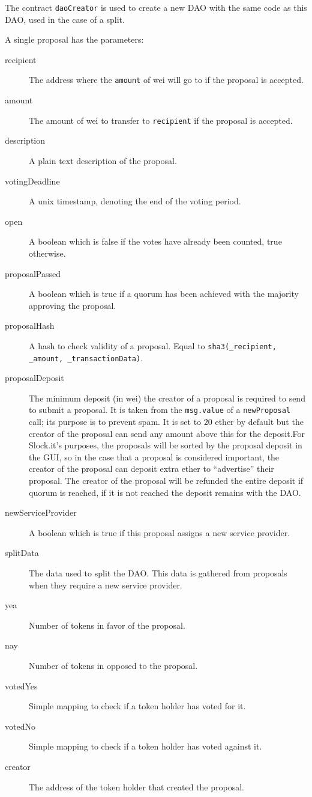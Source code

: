 \documentclass[9pt,oneside]{amsart}
\begin{document}
\begin{multicols}{2}
The contract \verb|daoCreator| is used to create a new DAO with the same code as this DAO, used in the case of a split.

A single proposal has the parameters:
\begin{description}
 \item[recipient] The address where the \verb|amount| of wei will go to if the proposal is accepted.
 \item[amount] The amount of wei to transfer to \verb|recipient| if the proposal is accepted.
 \item[description] A plain text description of the proposal.
 \item[votingDeadline] A unix timestamp, denoting the end of the voting period.
 \item[open] A boolean which is false if the votes have already been counted, true otherwise.
 \item[proposalPassed] A boolean which is true if a quorum has been achieved with the majority approving the proposal.
 \item[proposalHash] A hash to check validity of a proposal. Equal to \verb|sha3(_recipient, _amount, _transactionData)|.
 \item[proposalDeposit] The minimum deposit (in wei) the creator of a proposal is required to send to submit a proposal. It is taken from the \verb|msg.value| of a \verb|newProposal| call; its purpose is to prevent spam. It is set to $20$ ether by default but the creator of the proposal can send any amount above this for the deposit.For Slock.it’s purposes, the proposals will be sorted by the proposal deposit in the GUI, so in the case that a proposal is considered important, the creator of the proposal can deposit extra ether to “advertise” their proposal. The creator of the proposal will be refunded the entire deposit if quorum is reached, if it is not reached the deposit remains with the DAO. 
 \item[newServiceProvider] A boolean which is true if this proposal assigns a new service provider.
 \item[splitData] The data used to split the DAO. This data is gathered from proposals when they require a new service provider.
 \item[yea] Number of tokens in favor of the proposal.
 \item[nay] Number of tokens in opposed to the proposal.
 \item[votedYes] Simple mapping to check if a token holder has voted for it.
 \item[votedNo] Simple mapping to check if a token holder has voted against it.
 \item[creator] The address of the token holder that created the proposal.
\end{description}


\end{multicols}
\end{document}

